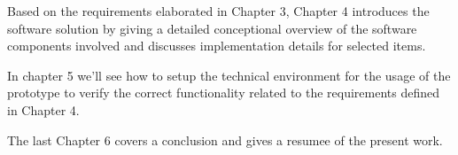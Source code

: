 Based on the requirements elaborated in Chapter 3, Chapter 4 introduces the software solution by
giving a detailed conceptional overview of the software components involved and discusses implementation
details for selected items.

In chapter 5 we'll see how to setup the technical environment for the usage of the prototype
to verify the correct functionality related to the requirements defined in Chapter 4.

The last Chapter 6 covers a conclusion and gives a resumee of the present work.